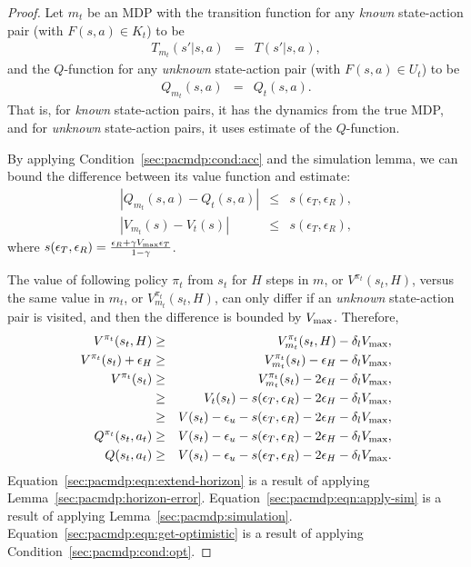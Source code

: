 \begin{proof}

Let $m_t$ be an MDP with the transition function for any \emph{known} state-action pair (with $F(s,a) \in K_t$) to be
\begin{eqnarray}
T_{m_t}(s'|s,a) &=& T(s'|s,a),
\end{eqnarray}
and the $Q$-function for any \emph{unknown} state-action pair (with $F(s,a) \in U_t$) to be
\begin{eqnarray}
Q_{m_t}(s,a) &=& Q_t(s,a).
\end{eqnarray}
That is, for \emph{known} state-action pairs, it has the dynamics from the true MDP, and for \emph{unknown} state-action pairs, it uses \As estimate of the $Q$-function.

By applying Condition~\ref{sec:pacmdp:cond:acc} and the simulation lemma, we can bound the difference between its value function and \As estimate:
\begin{eqnarray}
|Q_{m_t}(s,a) - Q_t(s,a)| &\leq& s(\epsilon_T,\epsilon_R),\\
|V_{m_t}(s) - V_t(s)| &\leq& s(\epsilon_T,\epsilon_R),
\end{eqnarray}
where $s(\epsilon_T,\epsilon_R) = \frac{ \epsilon_R + \gamma V_{\rm max}\epsilon_T }{1-\gamma}$.

The value of following policy $\pi_t$ from $s_t$ for $H$ steps in $m$, or $V^{\pi_t}(s_t,H)$, versus the same value in $m_t$, or $V^{\pi_t}_{m_t}(s_t,H)$, can only differ if an \emph{unknown} state-action pair is visited, and then the difference is bounded by $V_{\rm max}$. Therefore,
\begin{eqnarray}
V^{\pi_t}(s_t,H) &\geq& V^{\pi_t}_{m_t}(s_t,H) - \delta_lV_{\rm max},\\
\label{sec:pacmdp:eqn:extend-horizon}
V^{\pi_t}(s_t) + \epsilon_H  &\geq& V^{\pi_t}_{m_t}(s_t) - \epsilon_H - \delta_lV_{\rm max},\\
V^{\pi_t}(s_t) &\geq& V^{\pi_t}_{m_t}(s_t) - 2\epsilon_H - \delta_lV_{\rm max},\\
\label{sec:pacmdp:eqn:apply-sim}
 &\geq& V_t(s_t) - s(\epsilon_T,\epsilon_R) -2 \epsilon_H - \delta_lV_{\rm max},\\
\label{sec:pacmdp:eqn:get-optimistic}
 &\geq& V(s_t) - \epsilon_u - s(\epsilon_T,\epsilon_R) -2 \epsilon_H - \delta_lV_{\rm max},\\
Q^{\pi_t}(s_t,a_t) &\geq& V(s_t) - \epsilon_u - s(\epsilon_T,\epsilon_R) -2 \epsilon_H - \delta_lV_{\rm max},\\
Q(s_t,a_t) &\geq& V(s_t) - \epsilon_u - s(\epsilon_T,\epsilon_R) -2 \epsilon_H - \delta_lV_{\rm max}.
\end{eqnarray}
Equation~\ref{sec:pacmdp:eqn:extend-horizon} is a result of applying Lemma~\ref{sec:pacmdp:horizon-error}.
Equation~\ref{sec:pacmdp:eqn:apply-sim} is a result of applying Lemma~\ref{sec:pacmdp:simulation}.
Equation~\ref{sec:pacmdp:eqn:get-optimistic} is a result of applying Condition~\ref{sec:pacmdp:cond:opt}.



\end{proof}
